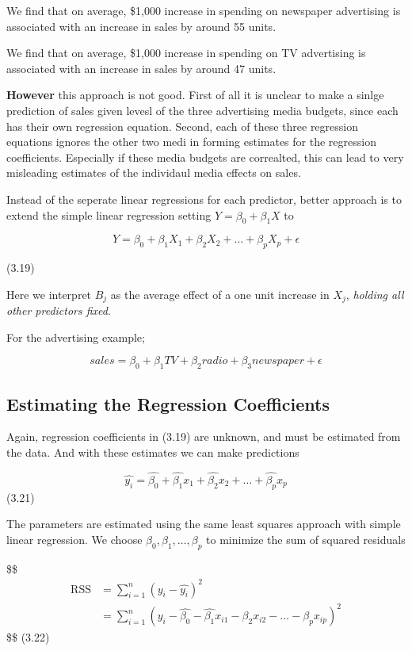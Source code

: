 \documentclass[
  letterpaper,
  DIV=11,
  numbers=noendperiod]{scrreprt}
\begin{document}
We find that on average, \$1,000 increase in spending on newspaper
advertising is associated with an increase in sales by around 55 units.

We find that on average, \$1,000 increase in spending on TV advertising
is associated with an increase in sales by around 47 units.

\textbf{However} this approach is not good. First of all it is unclear
to make a sinlge prediction of sales given levesl of the three
advertising media budgets, since each has their own regression equation.
Second, each of these three regression equations ignores the other two
medi in forming estimates for the regression coefficients. Especially if
these media budgets are correalted, this can lead to very misleading
estimates of the individaul media effects on sales.

Instead of the seperate linear regressions for each predictor, better
approach is to extend the simple linear regression setting
\(Y = \beta_0 + \beta_1 X\) to

\[
Y = \beta_0 + \beta_1 X_1 + \beta_2 X_2 + \dots + \beta_p X_p + \epsilon
\]

(3.19)

Here we interpret \(B_j\) as the average effect of a one unit increase
in \(X_j\), \emph{holding all other predictors fixed}.

For the advertising example;

\[
sales = \beta_0 + \beta_1 TV + \beta_2 radio + \beta_3 newspaper + \epsilon
\]

\hypertarget{estimating-the-regression-coefficients}{%
\subsection{Estimating the Regression
Coefficients}\label{estimating-the-regression-coefficients}}

Again, regression coefficients in (3.19) are unknown, and must be
estimated from the data. And with these estimates we can make
predictions

\[
\hat{y_i} = \hat{\beta_0} + \hat{\beta_1}x_1 + \hat{\beta_2}x_2 + \dots + \hat{\beta_p}x_p
\] (3.21)

The parameters are estimated using the same least squares approach with
simple linear regression. We choose \(\beta_0, \beta_1, \dots, \beta_p\)
to minimize the sum of squared residuals

\$\$ \begin{align}

\text{RSS} &= \sum_{i = 1}^n(y_i - \hat{y_i})^2 \\
&= \sum_{i = 1}^n(y_i - \hat{\beta_0} - \hat{\beta_1}x_{i1} - \beta_2x_{i2} - \dots - \beta_px_{ip})^2

\end{align} \$\$ (3.22)
\end{document}
